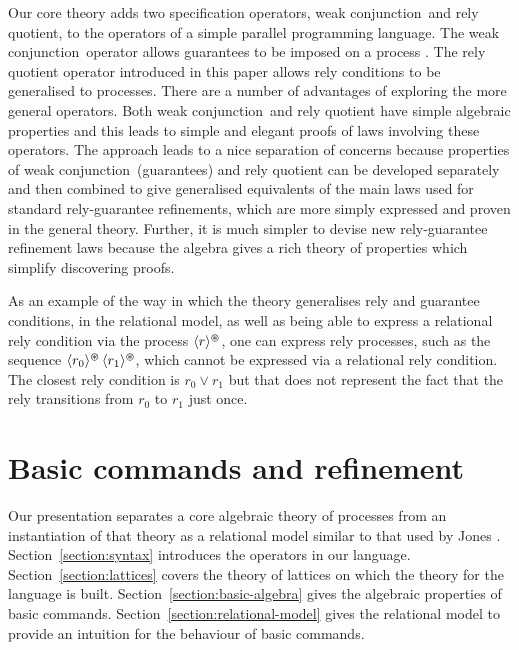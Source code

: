 \documentclass[fleqn]{fac}
\newcommand{\SSeq}{\,}
\newcommand{\atomicrel}[1]{\langle#1\rangle}
\newcommand{\FinSkipIter}{^{\varoast}}
\newcommand{\FinGuar}[1]{\atomicrel{#1}\FinSkipIter}
\newcommand{\strictconjunction}{weak conjunction}
\begin{document}
Our core theory adds two specification operators, \strictconjunction\ and rely quotient,
to the operators of a simple parallel programming language.
The \strictconjunction\ operator allows guarantees to be imposed on a process \cite{HayesJonesColvin14TR}.
The rely quotient operator introduced in this paper allows rely conditions to be generalised to processes.
There are a number of advantages of exploring the more general operators.
Both \strictconjunction\ and rely quotient have simple algebraic properties
and this leads to simple and elegant proofs of laws involving these operators.
The approach leads to a nice separation of concerns 
because properties of \strictconjunction\ (guarantees) and rely quotient can
be developed separately
and then combined to give 
generalised equivalents of the main laws used for standard rely-guarantee refinements, 
which are more simply expressed and proven in the general theory.
Further, it is much simpler to devise new rely-guarantee refinement laws 
because the algebra gives a rich theory of properties which simplify discovering proofs.

As an example of the way in which the theory generalises rely and guarantee conditions,
in the relational model, as well as being able to express 
a relational rely condition via the process $\FinGuar{r}$,
one can express rely processes, such as the sequence $\FinGuar{r_0} \SSeq \FinGuar{r_1}$,
which cannot be expressed via a relational rely condition.
The closest rely condition is $r_0 \lor r_1$
but that does not represent the fact that the rely transitions from $r_0$ to $r_1$ just once.











\section{Basic commands and refinement}\label{section:basics}

Our presentation separates a core algebraic theory of processes
from an instantiation of that theory as a relational model 
similar to that used by Jones \cite{CoJo07}.
Section~\ref{section:syntax} introduces the operators in our language.
Section~\ref{section:lattices} covers the theory of lattices on which the theory for the language is built.
Section~\ref{section:basic-algebra} gives the algebraic properties of basic commands.
Section~\ref{section:relational-model} gives the relational model 
to provide an intuition for the behaviour of basic commands.
\end{document}
